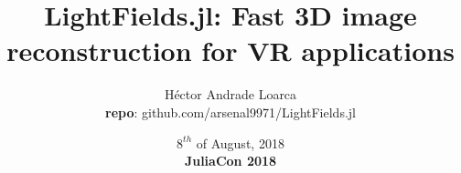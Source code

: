 \title[LightFields.jl]{LightFields.jl: Fast 3D image reconstruction for VR applications}
\author{H\'ector Andrade Loarca \\ \textbf{repo}: github.com/arsenal9971/LightFields.jl}
\date[JuliaCon 2018]{$8^{th}$ of August, 2018 \\ \textbf{JuliaCon 2018}}

\newcommand{\mylogo}{\texttt{[image: images/bms-logo-button.png]}}

\begin{frame}[plain]
	\titlepage
\end{frame}

